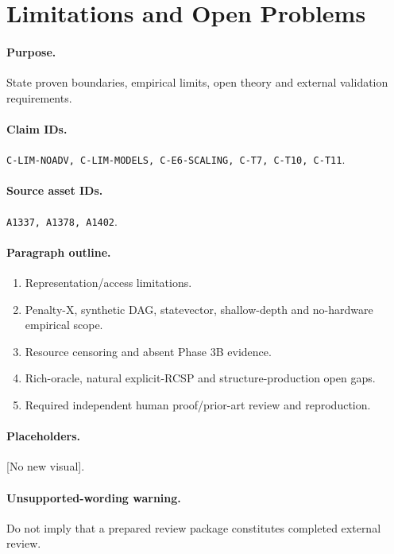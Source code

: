 \section{Limitations and Open Problems}

\paragraph{Purpose.}
State proven boundaries, empirical limits, open theory and external validation
requirements.

\paragraph{Claim IDs.}
\texttt{C-LIM-NOADV, C-LIM-MODELS, C-E6-SCALING, C-T7, C-T10, C-T11}.

\paragraph{Source asset IDs.}
\texttt{A1337, A1378, A1402}.

\paragraph{Paragraph outline.}
\begin{enumerate}
  \item Representation/access limitations.
  \item Penalty-X, synthetic DAG, statevector, shallow-depth and no-hardware
  empirical scope.
  \item Resource censoring and absent Phase 3B evidence.
  \item Rich-oracle, natural explicit-RCSP and structure-production open gaps.
  \item Required independent human proof/prior-art review and reproduction.
\end{enumerate}

\paragraph{Placeholders.}
[No new visual].

\paragraph{Unsupported-wording warning.}
Do not imply that a prepared review package constitutes completed external
review.
